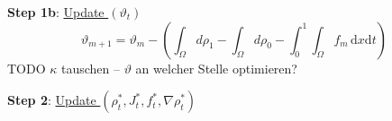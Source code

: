 
\textbf{Step 1b}: \underline{Update $(\vartheta_t)$}
$$
\vartheta_{m+1} = \vartheta_m - \left(\int_\Omega d\rho_1 - \int_\Omega d\rho_0 - \int_0^1\int_\Omega f_m \,\mathrm{d}x\mathrm{d}t\right)
$$
TODO $\kappa$ tauschen -- $\vartheta$ an welcher Stelle optimieren?

\textbf{Step 2}: \underline{Update $(\rho_t^*, J_t^*, f_t^*, \nabla\rho_t^*)$}

